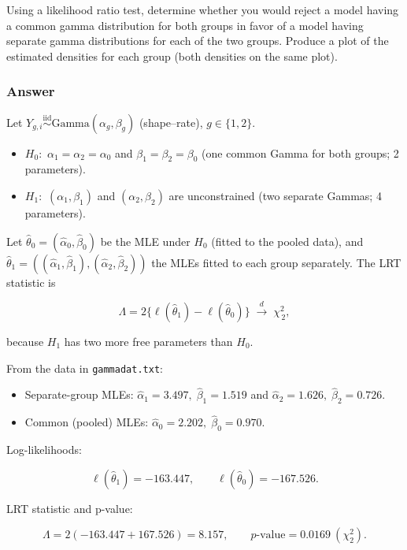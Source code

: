 \documentclass[
]{article}
\providecommand{\tightlist}{%
  \setlength{\itemsep}{0pt}\setlength{\parskip}{0pt}}
\begin{document}
Using a likelihood ratio test, determine whether you would reject a
model having a common gamma distribution for both groups in favor of a
model having separate gamma distributions for each of the two groups.
Produce a plot of the estimated densities for each group (both densities
on the same plot).

\subsubsection{Answer}\label{answer-2}

Let
\(Y_{g,i}\stackrel{\text{iid}}{\sim}\mathrm{Gamma}(\alpha_g,\beta_g)\)
(shape--rate), \(g\in\{1,2\}\).

\begin{itemize}
\tightlist
\item
  \(H_0:\) \(\alpha_1=\alpha_2=\alpha_0\) and
  \(\beta_1=\beta_2=\beta_0\) (one common Gamma for both groups; 2
  parameters).
\item
  \(H_1:\) \((\alpha_1,\beta_1)\) and \((\alpha_2,\beta_2)\) are
  unconstrained (two separate Gammas; 4 parameters).
\end{itemize}

Let \(\hat\theta_0=(\hat\alpha_0,\hat\beta_0)\) be the MLE under \(H_0\)
(fitted to the pooled data), and
\(\hat\theta_1=((\hat\alpha_1,\hat\beta_1),(\hat\alpha_2,\hat\beta_2))\)
the MLEs fitted to each group separately. The LRT statistic is

\[
\Lambda = 2\bigl\{\ell(\hat\theta_1)-\ell(\hat\theta_0)\bigr\}
\;\xrightarrow{d}\; \chi^2_{\,2},
\]

because \(H_1\) has two more free parameters than \(H_0\).

From the data in \texttt{gammadat.txt}:

\begin{itemize}
\tightlist
\item
  Separate-group MLEs: \(\hat\alpha_1=3.497,\;\hat\beta_1=1.519\) and
  \(\hat\alpha_2=1.626,\;\hat\beta_2=0.726\).
\item
  Common (pooled) MLEs: \(\hat\alpha_0=2.202,\;\hat\beta_0=0.970\).
\end{itemize}

Log-likelihoods:

\[
\ell(\hat\theta_1)=-163.447,\qquad \ell(\hat\theta_0)=-167.526.
\]

LRT statistic and p-value:

\[
\Lambda = 2(-163.447 + 167.526)=8.157,\qquad
p\text{-value} = 0.0169\ (\chi^2_{2}).
\]
\end{document}
